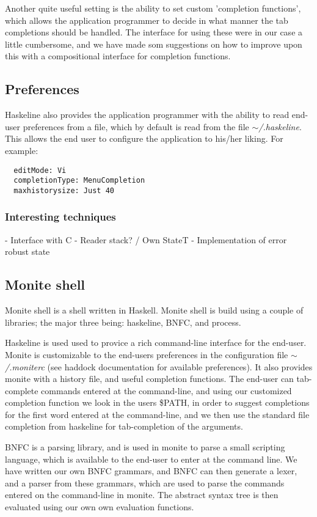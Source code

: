 \documentclass[11pt,a4paper]{article}
\begin{document}
Another quite useful setting is the ability to set custom 'completion
functions', which allows the application programmer to decide in what manner the
tab completions should be handled. The interface for using these were in our
case a little cumbersome, and we have made som suggestions on how to improve
upon this with a compositional interface for completion functions.

\subsection{Preferences}
Haskeline also provides the application programmer with the ability to read
end-user preferences from a file, which by default is read from the file
$\mathtt{\sim}$\textit{/.haskeline}. This allows the end user to configure the
application to his/her liking. For example:

\begin{verbatim}
  editMode: Vi
  completionType: MenuCompletion
  maxhistorysize: Just 40
\end{verbatim}

\subsubsection{Interesting techniques}
- Interface with C
- Reader stack? / Own StateT
- Implementation of error robust state


\subsection{Monite shell}
Monite shell is a shell written in Haskell. Monite shell is build using a couple
of libraries; the major three being: haskeline, BNFC, and process.

Haskeline is used used to provice a rich command-line interface for the
end-user. Monite is customizable to the end-users preferences in the
configuration file $\mathtt{\sim}$\textit{/.moniterc} (see haddock documentation
for available preferences). It also provides monite with a history file, and
useful completion functions. The end-user can tab-complete commands entered at
the command-line, and using our customized completion function we look in the
users \$PATH, in order to suggest completions for the first word entered at the
command-line, and we then use the standard file completion from haskeline for
tab-completion of the arguments.

BNFC is a parsing library, and is used in monite to parse a small scripting
language, which is available to the end-user to enter at the command line. We
have written our own BNFC grammars, and BNFC can then generate a lexer, and a
parser from these grammars, which are used to parse the commands entered on the
command-line in monite. The abstract syntax tree is then evaluated using our own
own evaluation functions.
\end{document}
